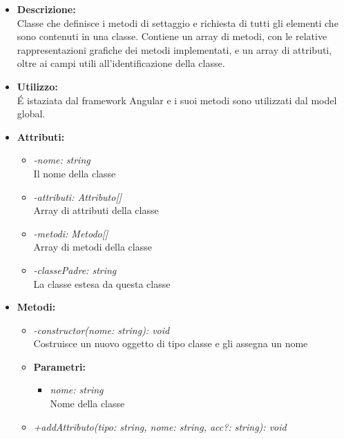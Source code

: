 				\begin{itemize}
          			\item \textbf{Descrizione:}\\
          			Classe che definisce i metodi di settaggio e richiesta di tutti gli elementi che sono contenuti in una classe. Contiene un array di metodi, con le relative rappresentazioni grafiche dei metodi implementati, e un array di attributi, oltre ai campi utili all’identificazione della classe.
          			\item \textbf{Utilizzo:}\\
          			É istaziata dal framework Angular e i suoi metodi sono utilizzati dal model global.
          			\item \textbf{Attributi:}\\
          			\begin{itemize}
          				\item \emph{-nome: string}\\
            			Il nome della classe
            			\item \emph{-attributi: Attributo[]}\\
            			Array di attributi della classe
            			\item \emph{-metodi: Metodo[]}\\
            			Array di metodi della classe
            			\item \emph{-classePadre: string}\\
            			La classe estesa da questa classe
          			\end{itemize}
          			\item \textbf{Metodi:}\\
          			\begin{itemize}
          				\item \emph{-constructor(nome: string): void}\\
            			Costruisce un nuovo oggetto di tipo classe e gli assegna un nome
            			\item \textbf{Parametri:}\\
            				\begin{itemize}
            					\item \emph{nome: string}\\
            					Nome della classe
            				\end{itemize}
            			\item \emph{+addAttributo(tipo: string, nome: string, acc?: string): void}\\

\end{itemize}
\end{itemize}

